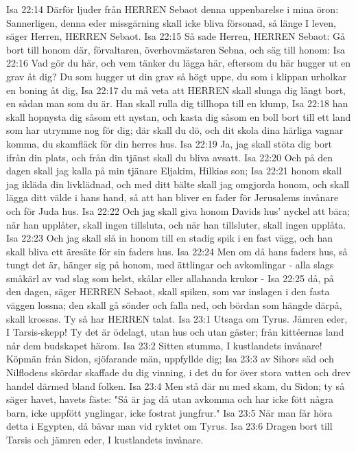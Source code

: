 Isa 22:14  Därför ljuder från HERREN Sebaot denna uppenbarelse i mina öron: Sannerligen, denna eder missgärning skall icke bliva försonad, så länge I leven, säger Herren, HERREN Sebaot.
Isa 22:15  Så sade Herren, HERREN Sebaot: Gå bort till honom där, förvaltaren, överhovmästaren Sebna, och säg till honom:
Isa 22:16  Vad gör du här, och vem tänker du lägga här, eftersom du här hugger ut en grav åt dig? Du som hugger ut din grav så högt uppe, du som i klippan urholkar en boning åt dig,
Isa 22:17  du må veta att HERREN skall slunga dig långt bort, en sådan man som du är. Han skall rulla dig tillhopa till en klump,
Isa 22:18  han skall hopnysta dig såsom ett nystan, och kasta dig såsom en boll bort till ett land som har utrymme nog för dig; där skall du dö, och dit skola dina härliga vagnar komma, du skamfläck för din herres hus.
Isa 22:19  Ja, jag skall stöta dig bort ifrån din plats, och från din tjänst skall du bliva avsatt.
Isa 22:20  Och på den dagen skall jag kalla på min tjänare Eljakim, Hilkias son;
Isa 22:21  honom skall jag ikläda din livklädnad, och med ditt bälte skall jag omgjorda honom, och skall lägga ditt välde i hans hand, så att han bliver en fader för Jerusalems invånare och för Juda hus.
Isa 22:22  Och jag skall giva honom Davids hus' nyckel att bära; när han upplåter, skall ingen tillsluta, och när han tillsluter, skall ingen upplåta.
Isa 22:23  Och jag skall slå in honom till en stadig spik i en fast vägg, och han skall bliva ett äresäte för sin faders hus.
Isa 22:24  Men om då hans faders hus, så tungt det är, hänger sig på honom, med ättlingar och avkomlingar - alla slags småkärl av vad slag som helst, skålar eller allahanda krukor -
Isa 22:25  då, på den dagen, säger HERREN Sebaot, skall spiken, som var inslagen i den fasta väggen lossna; den skall gå sönder och falla ned, och bördan som hängde därpå, skall krossas. Ty så har HERREN talat.
Isa 23:1  Utsaga om Tyrus. Jämren eder, I Tarsis-skepp! Ty det är ödelagt, utan hus och utan gäster; från kittéernas land når dem budskapet härom.
Isa 23:2  Sitten stumma, I kustlandets invånare! Köpmän från Sidon, sjöfarande män, uppfyllde dig;
Isa 23:3  av Sihors säd och Nilflodens skördar skaffade du dig vinning, i det du for över stora vatten och drev handel därmed bland folken.
Isa 23:4  Men stå där nu med skam, du Sidon; ty så säger havet, havets fäste: "Så är jag då utan avkomma och har icke fött några barn, icke uppfött ynglingar, icke fostrat jungfrur."
Isa 23:5  När man får höra detta i Egypten, då bävar man vid ryktet om Tyrus.
Isa 23:6  Dragen bort till Tarsis och jämren eder, I kustlandets invånare.
